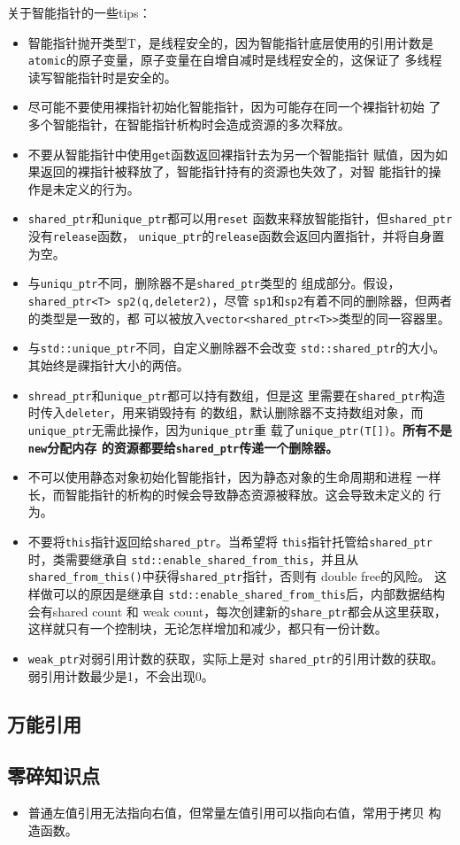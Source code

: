 关于智能指针的一些tips：
\begin{itemize}
\item 智能指针抛开类型T，是线程安全的，因为智能指针底层使用的引用计数是
\texttt{atomic}的原子变量，原子变量在自增自减时是线程安全的，这保证了
多线程读写智能指针时是安全的。
\item 尽可能不要使用裸指针初始化智能指针，因为可能存在同一个裸指针初始
  了多个智能指针，在智能指针析构时会造成资源的多次释放。
\item 不要从智能指针中使用\texttt{get}函数返回裸指针去为另一个智能指针
  赋值，因为如果返回的裸指针被释放了，智能指针持有的资源也失效了，对智
  能指针的操作是未定义的行为。
\item \texttt{shared\_ptr}和\texttt{unique\_ptr}都可以用\texttt{reset}
  函数来释放智能指针，但\texttt{shared\_ptr}没有\texttt{release}函数，
  \texttt{unique\_ptr}的\texttt{release}函数会返回内置指针，并将自身置
  为空。
\item 与\texttt{uniqu\_ptr}不同，删除器不是\texttt{shared\_ptr}类型的
  组成部分。假设，\texttt{shared\_ptr<T> sp2(q,deleter2)}，尽管
  \texttt{sp1}和\texttt{sp2}有着不同的删除器，但两者的类型是一致的，都
  可以被放入\texttt{vector<shared\_ptr<T>>}类型的同一容器里。
\item 与\texttt{std::unique\_ptr}不同，自定义删除器不会改变
  \texttt{std::shared\_ptr}的大小。其始终是祼指针大小的两倍。
\item \texttt{shread\_ptr}和\texttt{unique\_ptr}都可以持有数组，但是这
  里需要在\texttt{shared\_ptr}构造时传入\texttt{deleter}，用来销毁持有
  的数组，默认删除器不支持数组对象，而\texttt{unique\_ptr}无需此操作，因为\texttt{unique\_ptr}重
  载了\texttt{unique\_ptr(T[])}。\textbf{所有不是\texttt{new}分配内存
    的资源都要给\texttt{shared\_ptr}传递一个删除器。}
\item 不可以使用静态对象初始化智能指针，因为静态对象的生命周期和进程
  一样长，而智能指针的析构的时候会导致静态资源被释放。这会导致未定义的
  行为。
\item 不要将\texttt{this}指针返回给\texttt{shared\_ptr}。当希望将
  \texttt{this}指针托管给\texttt{shared\_ptr}时，类需要继承自
  \texttt{std::enable\_shared\_from\_this}，并且从
  \texttt{shared\_from\_this()}中获得\texttt{shared\_ptr}指针，否则有
  double free的风险。 这样做可以的原因是继承自
  \texttt{std::enable\_shared\_from\_this}后，内部数据结构会有shared
  count 和 weak count，每次创建新的\texttt{share\_ptr}都会从这里获取，
  这样就只有一个控制块，无论怎样增加和减少，都只有一份计数。
\item \texttt{weak\_ptr}对弱引用计数的获取，实际上是对
  \texttt{shared\_ptr}的引用计数的获取。弱引用计数最少是1，不会出现0。
\end{itemize}

\subsection{万能引用}


\subsection{零碎知识点}

\begin{itemize}
\item 普通左值引用无法指向右值，但常量左值引用可以指向右值，常用于拷贝
  构造函数。
\end{itemize}
